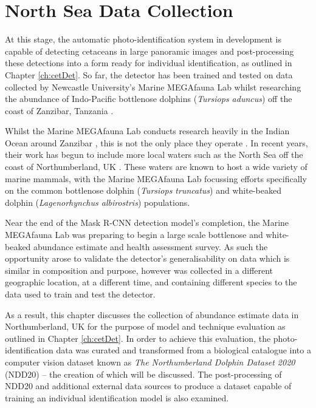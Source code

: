 \chapter{North Sea Data Collection} \label{ch:NDD}

At this stage, the automatic photo-identification system in development is capable of detecting cetaceans in large panoramic images and post-processing these detections into a form ready for individual identification, as outlined in Chapter \ref{ch:cetDet}. So far, the detector has been trained and tested on data collected by Newcastle University's Marine MEGAfauna Lab whilst researching the abundance of Indo-Pacific bottlenose dolphins (\textit{Tursiops aduncus}) off the coast of Zanzibar, Tanzania \cite{sharpe_indian_2019}. 

Whilst the Marine MEGAfauna Lab conducts research heavily in the Indian Ocean around Zanzibar \cite{yang_description_2020, temple_life-history_2020, temple_marine_2019, temple_marine_2018, weigmann_revision_2020, barrowclift_social_2017}, this is not the only place they operate \cite{temple_by-catch_2021, yang_classification_2017, yang_influence_2022}. In recent years, their work has begun to include more local waters such as the North Sea off the coast of Northumberland, UK \cite{van_bressem_visual_2018, yang_characterization_2021}. These waters are known to host a wide variety of marine mammals, with the Marine MEGAfauna Lab focussing efforts specifically on the common bottlenose dolphin (\textit{Tursiops truncatus}) and white-beaked dolphin (\textit{Lagenorhynchus albirostris}) populations.

Near the end of the Mask R-CNN detection model's completion, the Marine MEGAfauna Lab was preparing to begin a large scale bottlenose and white-beaked abundance estimate and health assessment survey. As such the opportunity arose to validate the detector's generalisability on data which is similar in composition and purpose, however was collected in a different geographic location, at a different time, and containing different species to the data used to train and test the detector.

As a result, this chapter discusses the collection of abundance estimate data in Northumberland, UK for the purpose of model and technique evaluation as outlined in Chapter \ref{ch:cetDet}. In order to achieve this evaluation, the photo-identification data was curated and transformed from a biological catalogue into a computer vision dataset known as \textit{The Northumberland Dolphin Dataset 2020} (NDD20) -- the creation of which will be discussed. The post-processing of NDD20 and additional external data sources to produce a dataset capable of training an individual identification model is also examined. 

